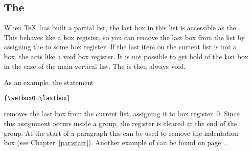 \documentclass{book}
\begin{document}
\subsection{The }
\label{lastbox}

When \TeX\ has built a partial list, the last box in this
list is accessible as the . This behaves
like a box register, so you can remove the last box from  the
list by assigning the  to some  box register.
If the last item on the current list is not a box,
the  acts like a void box register.
It is not possible to get hold of the last box
in the case of the main vertical list.
The  is then always void.

As an example, the statement
\begin{verbatim}
{\setbox0=\lastbox}
\end{verbatim}
removes
the last box from the current list, assigning it to box
register~0. Since this assignment occurs inside a group,
the register is cleared at the end of the group.
At the start of a paragraph this can be used to remove the
indentation box (see Chapter~\ref{par:start}).
Another example of  can be found on page~\pageref{varioset}.
\end{document}
